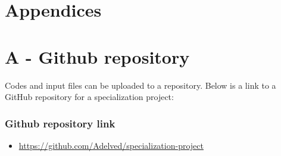 \chapter*{\LARGE \textbf{Appendices}}
\fancyhf{} %
\renewcommand{\headrulewidth}{0pt} %
\fancyfoot[C]{\thepage} %

\appendix


\chapter*{A - Github repository}

Codes and input files can be uploaded to a repository. Below is a link to a GitHub repository for a specialization project:


\subsection*{Github repository link}
\begin{itemize}
    \item \url{https://github.com/Adelved/specialization-project}
\end{itemize}




